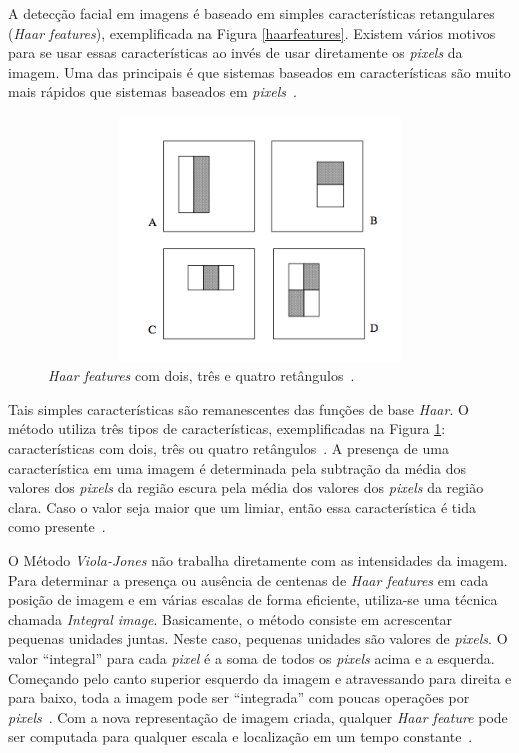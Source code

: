 A detecção facial em imagens é baseado em simples características retangulares (\textit{Haar features}), exemplificada na Figura \ref{haarfeatures}. Existem vários motivos para se usar essas características ao invés de usar diretamente os \textit{pixels} da imagem. Uma das principais é que sistemas baseados em características são muito mais rápidos que sistemas baseados em \textit{pixels}~\cite{violajones}. 

\begin{figure}[hbt]
		\begin{center}
			\includegraphics[height=6.5cm,width=12.5cm]{figuras/2.FundamentacaoTeorica/haarfeaturestypes.png}
		\end{center}
		\caption{\textit{Haar features} com dois, três e quatro retângulos~\cite{violajones}.}
		\label{haarfeaturestypes}
	\end{figure}

Tais simples características são remanescentes das funções de base \textit{Haar}. O método utiliza três tipos de características, exemplificadas na Figura \ref{haarfeaturestypes}: características com dois, três ou quatro retângulos~\cite{violajones}. A presença de uma característica em uma imagem é determinada pela subtração da média dos valores dos \textit{pixels} da região escura pela média dos valores dos \textit{pixels} da região clara. Caso o valor seja maior que um limiar, então essa característica é tida como presente~\cite{servodetection}.

O Método \textit{Viola-Jones} não trabalha diretamente com as intensidades da imagem. Para determinar a presença ou ausência de centenas de \textit{Haar features} em cada posição de imagem e em várias escalas de forma eficiente, utiliza-se uma técnica chamada \textit{Integral image}. Basicamente, o método consiste em acrescentar pequenas unidades juntas. Neste caso, pequenas unidades são valores de \textit{pixels}. O valor ``integral'' para cada \textit{pixel} é a soma de todos os \textit{pixels} acima e a esquerda. Começando pelo canto superior esquerdo da imagem e atravessando para direita e para baixo, toda a imagem pode ser ``integrada'' com poucas operações por \textit{pixels}~\cite{servodetection, violajones}. Com a nova representação de imagem criada, qualquer \textit{Haar feature} pode ser computada para qualquer escala e localização em um tempo constante~\cite{violajones}.

